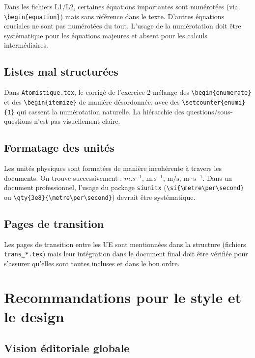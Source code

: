 \documentclass[12pt,a4paper]{article}
\newcommand{\fichier}[1]{\texttt{\small\color{Purple}#1}}
\begin{document}
Dans les fichiers L1/L2, certaines équations importantes sont numérotées (via \verb|\begin{equation}|) mais sans référence dans le texte. D'autres équations cruciales ne sont pas numérotées du tout. L'usage de la numérotation doit être systématique pour les équations majeures et absent pour les calculs intermédiaires.

\subsection{Listes mal structurées}

Dans \fichier{Atomistique.tex}, le corrigé de l'exercice 2 mélange des \verb|\begin{enumerate}| et des \verb|\begin{itemize}| de manière désordonnée, avec des \verb|\setcounter{enumi}{1}| qui cassent la numérotation naturelle. La hiérarchie des questions/sous-questions n'est pas visuellement claire.

\subsection{Formatage des unités}

Les unités physiques sont formatées de manière incohérente à travers les documents. On trouve successivement : $m.s^{-1}$, $\text{m.s}^{-1}$, $\mathrm{m/s}$, $\mathrm{m \cdot s^{-1}}$. Dans un document professionnel, l'usage du package \verb|siunitx| (\verb|\si{\metre\per\second}| ou \verb|\qty{3e8}{\metre\per\second}|) devrait être systématique.

\subsection{Pages de transition}

Les pages de transition entre les UE sont mentionnées dans la structure (fichiers \fichier{trans\_*.tex}) mais leur intégration dans le document final doit être vérifiée pour s'assurer qu'elles sont toutes incluses et dans le bon ordre.

\section{Recommandations pour le style et le design}

\subsection{Vision éditoriale globale}
\end{document}

